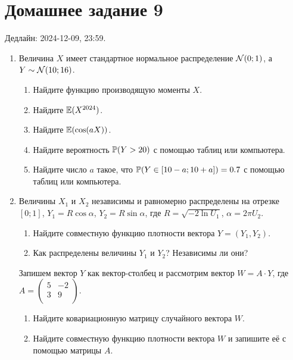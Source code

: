 \section*{Домашнее задание 9}


Дедлайн: 2024-12-09, 23:59.

\newcommand{\dBeta}{\mathrm{Beta}}

\begin{enumerate}

\item Величина $X$ имеет стандартное нормальное распределение $\cN(0;1)$, а $Y \sim \cN(10; 16)$.

\begin{enumerate}
    \item Найдите функцию производящую моменты $X$.
    \item Найдите $\E(X^{2024})$.
    \item Найдите $\E(\cos(aX))$.
    \item Найдите вероятность $\P(Y > 20)$ с помощью таблиц или компьютера. 
    \item Найдите число $a$ такое, что $\P(Y \in [10 - a; 10 + a]) = 0.7$ с помощью таблиц или компьютера.
\end{enumerate}

\item Величины $X_1$ и $X_2$ независимы и равномерно распределены на отрезке $[0;1]$, $Y_1 = R \cos \alpha$, $Y_2 = R \sin \alpha$, где
$R = \sqrt{-2\ln U_1}$, $\alpha = 2\pi U_2$.

\begin{enumerate}
    \item Найдите совместную функцию плотности вектора $Y = (Y_1, Y_2)$.
    \item Как распределены величины $Y_1$ и $Y_2$? Независимы ли они?
\end{enumerate}
Запишем вектор $Y$ как вектор-столбец и рассмотрим вектор $W = A \cdot Y$, где $A = \begin{pmatrix}
    5 & -2 \\
    3 & 9 \\
\end{pmatrix}$.
\begin{enumerate}[resume]
    \item Найдите ковариационную матрицу случайного вектора $W$. 
    \item Найдите совместную функцию плотности вектора $W$ и запишите её с помощью матрицы $A$. 
\end{enumerate}


\end{enumerate}
